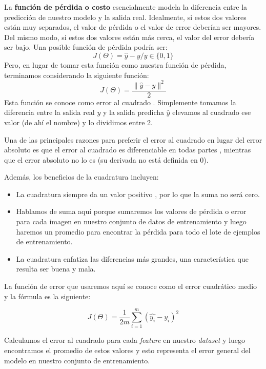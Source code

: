 \documentclass[a4paper,12pt]{article}
\begin{document}
La \textbf{función de pérdida o costo} esencialmente modela la diferencia entre la predicción de nuestro modelo y la salida real. Idealmente, si estos dos valores están muy separados, el valor de pérdida o el valor de error deberían ser mayores. Del mismo modo, si estos dos valores están más cerca, el valor del error debería ser bajo.
Una posible función de pérdida podría ser:
\begin{equation}
J(\Theta)=\hat{y}-y / y\in\{0,1\}
\end{equation}
Pero, en lugar de tomar esta función como nuestra función de pérdida, terminamos considerando la siguiente función:
\begin{equation}
J(\Theta)=\frac{\|\hat{y}-y\|^2}{2}
\end{equation}
Esta función se conoce como error al cuadrado . Simplemente tomamos la diferencia entre la salida real $y$ y la salida predicha $\hat{y}$ elevamos al cuadrado ese valor (de ahí el nombre) y lo dividimos entre 2.

Una de las principales razones para preferir el error al cuadrado en lugar del error absoluto es que el error al cuadrado es diferenciable en todas partes , mientras que el error absoluto no lo es (su derivada no está definida en 0).

Además, los beneficios de la cuadratura incluyen:
\begin{itemize}


\item La cuadratura siempre da un valor positivo , por lo que la suma no será cero.
\item Hablamos de suma aquí porque sumaremos los valores de pérdida o error para cada imagen en nuestro conjunto de datos de entrenamiento y luego haremos un promedio para encontrar la pérdida para todo el lote de ejemplos de entrenamiento.
\item La cuadratura enfatiza las diferencias más grandes, una característica que resulta ser buena y mala.

\end{itemize}

La función de error que usaremos aquí se conoce como el error cuadrático medio y la fórmula es la siguiente:

\begin{equation}
J(\Theta)=\frac{1}{2m} \sum_{i=1}^{m} (\hat{y_i}-y_i)^2
\label{funcperdida}
\end{equation}

Calculamos el error al cuadrado para cada \textit{feature} en nuestro \textit{dataset} y luego encontramos el promedio de estos valores y esto representa el error general del modelo en nuestro conjunto de entrenamiento.
\end{document}
